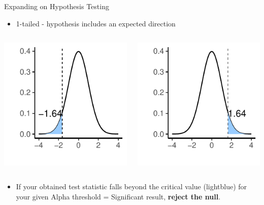 \documentclass[
  ignorenonframetext,
]{beamer}
\providecommand{\tightlist}{%
  \setlength{\itemsep}{0pt}\setlength{\parskip}{0pt}}
\begin{document}
\begin{frame}{Expanding on Hypothesis Testing}
\label{expanding-on-hypothesis-testing-1}
\begin{itemize}
\tightlist
\item
  1-tailed - hypothesis includes an expected direction
\end{itemize}

\begin{columns}[T]
\begin{column}{0.5\textwidth}
\vspace{1cm}

\includegraphics{Inferential-Stat-and-Z-test_files/figure-beamer/unnamed-chunk-3-1.pdf}
\end{column}

\begin{column}{0.5\textwidth}
\vspace{1cm}

\includegraphics{Inferential-Stat-and-Z-test_files/figure-beamer/unnamed-chunk-4-1.pdf}
\end{column}
\end{columns}

\begin{itemize}
\tightlist
\item
  If your obtained test statistic falls beyond the critical value
  (lightblue) for your given Alpha threshold = Significant result,
  \textbf{reject the null}.
\end{itemize}
\end{frame}
\end{document}
